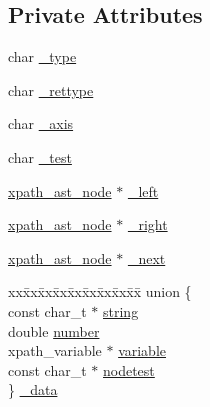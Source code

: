 \subsection*{Private Attributes}
\begin{DoxyCompactItemize}
\item 
char \hyperlink{classxpath__ast__node_ad285f423090a0aaee3c4126da65066d1}{\-\_\-type}
\item 
char \hyperlink{classxpath__ast__node_ab84a640f3a0f00d4d611d8cdd1f5c029}{\-\_\-rettype}
\item 
char \hyperlink{classxpath__ast__node_a97b21db6df156c37ef7f2e6f69478b77}{\-\_\-axis}
\item 
char \hyperlink{classxpath__ast__node_a421f6ed5f666ced9d6fe3692e84d7b89}{\-\_\-test}
\item 
\hyperlink{classxpath__ast__node}{xpath\-\_\-ast\-\_\-node} $\ast$ \hyperlink{classxpath__ast__node_ad229146ced94be21eb5e4921b43a7ebb}{\-\_\-left}
\item 
\hyperlink{classxpath__ast__node}{xpath\-\_\-ast\-\_\-node} $\ast$ \hyperlink{classxpath__ast__node_ab3935ea7e83f4421b20840cd84f0b37d}{\-\_\-right}
\item 
\hyperlink{classxpath__ast__node}{xpath\-\_\-ast\-\_\-node} $\ast$ \hyperlink{classxpath__ast__node_a10059a66ecff3384e175e00d9fa2afcd}{\-\_\-next}
\item 
\begin{tabbing}
xx\=xx\=xx\=xx\=xx\=xx\=xx\=xx\=xx\=\kill
union \{\\
\>const char\_t $\ast$ \hyperlink{classxpath__ast__node_a187822d65799b3bbccd8d0522bd14e59}{string}\\
\>double \hyperlink{classxpath__ast__node_a73870c7a83538e525398855b26154484}{number}\\
\>xpath\_variable $\ast$ \hyperlink{classxpath__ast__node_a0fd3b0d8f930836105eeff6e2efa5ad3}{variable}\\
\>const char\_t $\ast$ \hyperlink{classxpath__ast__node_a50f44079b7f3e399e23488f520a34f17}{nodetest}\\
\} \hyperlink{classxpath__ast__node_a4d08bfca00b137fc5b94314edeed2501}{\_data}\\

\end{tabbing}\end{DoxyCompactItemize}


